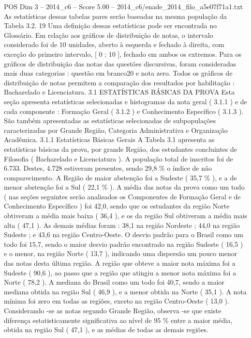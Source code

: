 \begin{textsample}{POS Dim 3 – 2014\_c6 – Score 5.00 – 2014\_c6/enade\_2014\_filo\_a5e07f71a1.txt}
As estatísticas dessas tabelas pares serão baseadas na mesma população da Tabela 3.2. 19 Uma definição dessas estatísticas pode ser encontrada no Glossário.
Em relação aos gráficos de distribuição de notas, o intervalo considerado foi de 10 unidades, aberto à esquerda e fechado à direita, com exceção do primeiro intervalo, [ 0 ; 10 ], fechado em ambos os extremos.
Para os gráficos de distribuição das notas das questões discursivas, foram consideradas mais duas categorias : questão em branco20 e nota zero.
Todos os gráficos de distribuição de notas permitem a comparação dos resultados por habilitação : Bacharelado e Licenciatura. 3.1 ESTATÍSTICAS BÁSICAS DA PROVA Esta seção apresenta estatísticas selecionadas e histogramas da nota geral ( 3.1.1 ) e de cada componente : Formação Geral ( 3.1.2 ) e Conhecimento Específico ( 3.1.3 ).
São também apresentadas as estatísticas selecionadas de subpopulações caracterizadas por Grande Região, Categoria Administrativa e Organização Acadêmica. 3.1.1 Estatísticas Básicas Gerais A Tabela 3.1 apresenta as estatísticas básicas da prova, por grande Região, dos estudantes concluintes de Filosofia ( Bacharelado e Licenciatura ).
A população total de inscritos foi de 6.733.
Destes, 4.728 estiveram presentes, sendo 29,8 \% o índice de não comparecimento.
A Região de maior abstenção foi a Sudeste ( 35,7 \% ), e a de menor abstenção foi a Sul ( 22,1 \% ).
A média das notas da prova como um todo ( nas seções seguintes serão analisados os Componentes de Formação Geral e de Conhecimento Específico ) foi 42,0, sendo que os estudantes da região Norte obtiveram a média mais baixa ( 36,4 ), e os da região Sul obtiveram a média mais alta ( 47,1 ).
As demais médias foram : 38,1 na região Nordeste ; 44,0 na região Sudeste ; e 43,6 na região Centro-Oeste.
O desvio padrão para o Brasil como um todo foi 15,7, sendo o maior desvio padrão encontrado na região Sudeste ( 16,5 ) e o menor, na região Norte ( 13,7 ), indicando uma dispersão um pouco menor das notas desta última região.
A região que obteve a maior nota máxima foi a Sudeste ( 90,6 ), ao passo que a região que atingiu a menor nota máxima foi a Norte ( 78,2 ).
A mediana do Brasil como um todo foi 40,7, sendo a maior mediana obtida na região Sul ( 46,9 ), e a menor obtida na Norte ( 35,1 ).
A nota mínima foi zero em todas as regiões, exceto na região Centro-Oeste ( 13,0 ).
Considerando -se as notas segundo Grande Região, observa -se que existe diferença estatisticamente significativa ao nível de 95 \% entre a maior média, obtida na região Sul ( 47,1 ), e as médias de todas as demais regiões.

\end{textsample}
